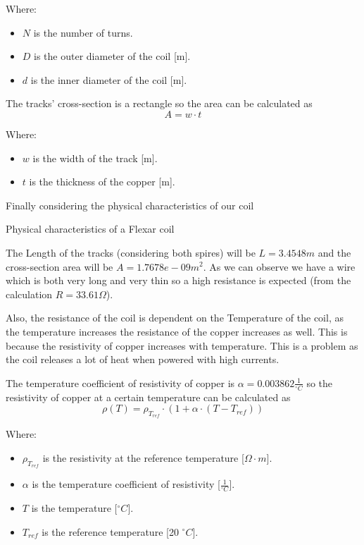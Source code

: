 Where:
\begin{itemize}
    \item \( N \) is the number of turns.
    \item \( D \) is the outer diameter of the coil [m].
    \item \( d \) is the inner diameter of the coil [m].
\end{itemize}

The tracks' cross-section is a rectangle so the area can be calculated as
\begin{equation}
    A = w \cdot t
\end{equation}
    
Where:
\begin{itemize}
    \item \( w \) is the width of the track [m].
    \item \( t \) is the thickness of the copper [m].
\end{itemize}


Finally considering the physical characteristics of our coil
\begin{table}[h!]
    \centering
    
    \caption{Physical characteristics of a Flexar coil}
    \label{tab: Physical characteristics of a Flexar coil}
\end{table}

The Length of the tracks (considering both spires) will be $L = 3.4548 m $ and the cross-section area will be $A = 1.7678e-09 m^2$.
As we can observe we have a wire which is both very long and very thin so a high resistance is expected (from the calculation $R = 33.61 \Omega $).

Also, the resistance of the coil is dependent on the Temperature of the coil, as the temperature increases the resistance of the copper increases as well. This is because the resistivity of copper increases with temperature. This is a problem as the coil releases a lot of heat when powered with high currents.

The temperature coefficient of resistivity of copper is $\alpha = 0.003862 \frac{1}{^{\circ}C}$ so the resistivity of copper at a certain temperature can be calculated as
\begin{equation}
    \rho(T) = \rho_{T_{ref}} \cdot (1 + \alpha \cdot (T - T_{ref}))
\end{equation}
    
Where: 
\begin{itemize}
    \item \( \rho_{T_{ref}} \) is the resistivity at the reference temperature [\(\Omega \cdot m\)].
    \item \( \alpha \) is the temperature coefficient of resistivity [\(\frac{1}{^{\circ}C}\)].
    \item \( T \) is the temperature [\(^{\circ}C\)].
    \item \( T_{ref} \) is the reference temperature [20 \(^{\circ}C\)].
\end{itemize}
    

